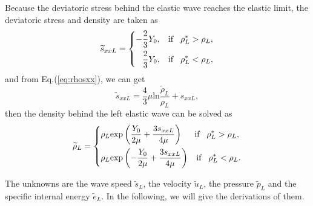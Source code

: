 \documentclass[review]{elsarticle}
\begin{document}
Because the deviatoric stress behind the elastic wave reaches the elastic limit, the deviatoric stress and density are taken as
\begin{equation}
  \widetilde{s}_{xxL} =\left\{ \begin{aligned}
      -\frac{2}{3}Y_0, \hspace{0.3cm} \text{if} \hspace{0.3cm} \rho_L^* > \rho_L,\\
      \frac{2}{3}Y_0, \hspace{0.3cm} \text{if} \hspace{0.3cm} \rho_L^* < \rho_L,\\
    \end{aligned}\right.
  \end{equation}
  and from Eq.(\ref{eq:rhosxx}), we can get
  \begin{equation}
	\widetilde{s}_{xxL} = \frac{4}{3}\mu \text{ln} \frac{\widetilde {\rho}_L}{\rho_L} +s_{xxL},
  \end{equation}
  then the density behind the left elastic wave can be solved as 
\begin{equation}   \widetilde{\rho}_{L} = \left\{ \begin{aligned}
      & \rho_L \text{exp}\left(\frac{Y_0}{2\mu}+\frac{3 s_{xxL}}{4\mu}\right)  \hspace{0.5cm} \text{if} \hspace{0.3cm} \rho_L^* > \rho_L,\\
& \rho_L \text{exp}\left(-\frac{Y_0}{2\mu}+\frac{3 s_{xxL}}{4\mu}\right)
\hspace{0.3cm} \text{if} \hspace{0.3cm} \rho_L^* < \rho_L.\\
  \end{aligned}\right.
 \end{equation}

 The unknowns are the wave speed $\widetilde{s}_L$,  the velocity  $\widetilde{u}_L$, the pressure $\widetilde{p}_L$ and the specific internal energy $\widetilde{e}_L$. In the following, we will give the derivations of them.
\end{document}
